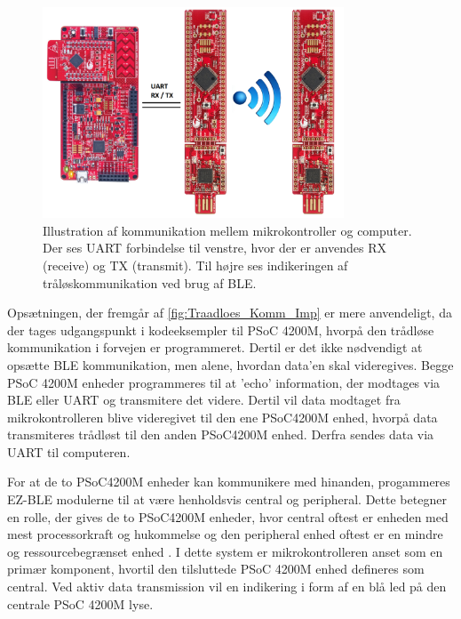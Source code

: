 \begin{figure}[H]
	\centering
	\includegraphics[width=0.8\textwidth]{figures/Traadloes_Komm_Imp}
	\caption{Illustration af kommunikation mellem mikrokontroller og computer. Der ses UART forbindelse til venstre, hvor der er anvendes RX (receive) og TX (transmit). Til højre ses indikeringen af tråløskommunikation ved brug af BLE.} 
	\label{fig:Traadloes_Komm_Imp}
\end{figure}

\noindent
Opsætningen, der fremgår af \autoref{fig:Traadloes_Komm_Imp} er mere anvendeligt, da der tages udgangspunkt i kodeeksempler til PSoC 4200M, hvorpå den trådløse kommunikation i forvejen er programmeret. Dertil er det ikke nødvendigt at opsætte BLE kommunikation, men alene, hvordan data'en skal videregives. 
Begge PSoC 4200M enheder programmeres til at 'echo' information, der modtages via BLE eller UART og transmitere det videre. Dertil vil data modtaget fra mikrokontrolleren blive videregivet til den ene PSoC4200M enhed, hvorpå data transmiteres trådløst til den anden PSoC4200M enhed. Derfra sendes data via UART til computeren. 

For at de to PSoC4200M enheder kan kommunikere med hinanden, progammeres EZ-BLE modulerne til at være henholdsvis central og peripheral. Dette betegner en rolle, der gives de to PSoC4200M enheder, hvor central oftest er enheden med mest processorkraft og hukommelse og den peripheral enhed oftest er en mindre og ressourcebegrænset enhed \citep{townsend2014}. I dette system er mikrokontrolleren anset som en primær komponent, hvortil den tilsluttede PSoC 4200M enhed defineres som central. Ved aktiv data transmission vil en indikering i form af en blå led på den centrale PSoC 4200M lyse.
